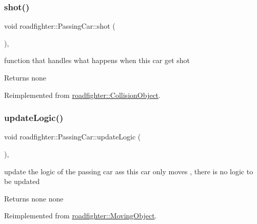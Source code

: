 \subsubsection{\texorpdfstring{shot()}{shot()}}
{\footnotesize\ttfamily void roadfighter\+::\+Passing\+Car\+::shot (\begin{DoxyParamCaption}{ }\end{DoxyParamCaption})\hspace{0.3cm}{\ttfamily [override]}, {\ttfamily [virtual]}}

function that handles what happens when this car get shot \begin{DoxyReturn}{Returns}
none  
\end{DoxyReturn}


Reimplemented from \hyperlink{classroadfighter_1_1CollisionObject_a55d891b6d9b50abdc44f964a40a7777c}{roadfighter\+::\+Collision\+Object}.

\mbox{\label{classroadfighter_1_1PassingCar_ac3fe3087290121bf44880f94efa3a916}} 
\subsubsection{\texorpdfstring{update\+Logic()}{updateLogic()}}
{\footnotesize\ttfamily void roadfighter\+::\+Passing\+Car\+::update\+Logic (\begin{DoxyParamCaption}{ }\end{DoxyParamCaption})\hspace{0.3cm}{\ttfamily [override]}, {\ttfamily [virtual]}}

update the logic of the passing car ass this car only moves , there is no logic to be updated \begin{DoxyReturn}{Returns}
none  none 
\end{DoxyReturn}


Reimplemented from \hyperlink{classroadfighter_1_1MovingObject_a2c5d69054a59fc5c6d7458f864ee9d57}{roadfighter\+::\+Moving\+Object}.

\mbox{\label{classroadfighter_1_1PassingCar_ade5ebca5d7dbdb75bd9eee5817972363}} 
